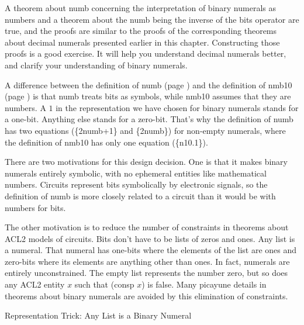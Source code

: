 A theorem about numb concerning the interpretation of
binary numerals as numbers and a theorem about the numb
being the inverse of the bits operator are true, 
and the proofs are similar to the proofs of the corresponding
theorems about decimal numerals presented earlier in this chapter.
Constructing those proofs is a good exercise.
It will help you understand decimal numerals better,
and clarify your understanding of binary numerals.

\begin{aside}
A difference between the definition of numb (page \pageref{nmb-defun})
and the definition of nmb10 (page \pageref{nmb10-defun})
is that numb treats bits as symbols,
while nmb10 assumes that they are numbers.
A $1$ in the representation we have chosen for binary numerals
stands for a one-bit. Anything else stands for a zero-bit.
That's why the definition of numb has two equations (\{2numb+1\} and \{2numb\})
for non-empty numerals,
where the definition of nmb10 has only one equation (\{n10.1\}).

There are two motivations for this design decision.
One is that it makes binary numerals entirely symbolic,
with no ephemeral entities like mathematical numbers.
Circuits represent bits symbolically by electronic signals,
so the definition of numb is more closely
related to a circuit than it would be with numbers for bits.

The other motivation is to reduce the number of constraints
in theorems about ACL2 models of circuits.
Bits don't have to be lists of zeros and ones.
Any list is a numeral.
That numeral has one-bits where the elements of the list are ones
and zero-bits where its elements are anything other than ones.
In fact, numerals are entirely unconstrained.
The empty list represents the number zero,
but so does any ACL2 entity $x$ such that (consp $x$) is false.
Many picayune details in theorems about binary numerals
are avoided by this elimination of constraints.
\caption{Representation Trick: Any List is a Binary Numeral}
\label{aside:numeral-representation-trick}
\end{aside}

